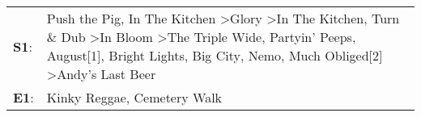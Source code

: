 \begin{supertabular}{p{0.03\textwidth}p{0.92\textwidth}}
 \textbf{S1}:  &  Push the Pig\textsuperscript{}, \enspace In The Kitchen\textsuperscript{} \textgreater \enspace Glory\textsuperscript{} \textgreater \enspace In The Kitchen\textsuperscript{}, \enspace Turn \& Dub\textsuperscript{} \textgreater \enspace In Bloom\textsuperscript{} \textgreater \enspace The Triple Wide\textsuperscript{}, \enspace Partyin' Peeps\textsuperscript{}, \enspace August[1]\textsuperscript{}, \enspace Bright Lights, Big City\textsuperscript{}, \enspace Nemo\textsuperscript{}, \enspace Much Obliged[2]\textsuperscript{} \textgreater \enspace Andy's Last Beer\textsuperscript{}  \enspace  \\
 \textbf{E1}:  &                                                                                                                                                                                                                                                                                                                                                                                                                                                                                                                                    Kinky Reggae\textsuperscript{}, \enspace Cemetery Walk\textsuperscript{}  \enspace  \\
\end{supertabular}
